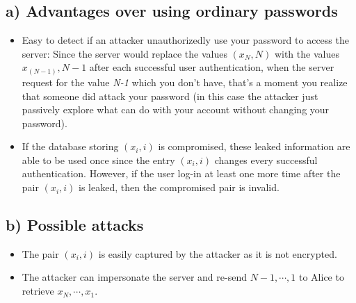 \subsection*{a) Advantages over using ordinary passwords}
%

\begin{itemize}
    \item Easy to detect if an attacker unauthorizedly use your password
    to access the server: Since the server would replace the values
    \((x_N,N)\) with the values \(x_(N-1),N-1\) after each successful
    user authentication, when the server request for the value \emph{N-1}
    which you don't have, that's a moment you realize that someone did
    attack your password (in this case the attacker just passively explore
    what can do with your account without changing your password).
    \item If the database storing \((x_i,i)\) is compromised, these leaked
    information are able to be used once since the entry \((x_i,i)\) changes
    every successful authentication. However, if the user log-in at least
    one more time after the pair \((x_i,i)\) is leaked, then the compromised
    pair is invalid.
\end{itemize}

\subsection*{b) Possible attacks}
%
\begin{itemize}
    \item The pair \((x_i,i)\) is easily captured by the attacker as it is not
    encrypted.
    \item The attacker can impersonate the server and re-send \(N-1,\cdots,1\)
    to Alice to retrieve \(x_N,\cdots,x_1\).
\end{itemize}